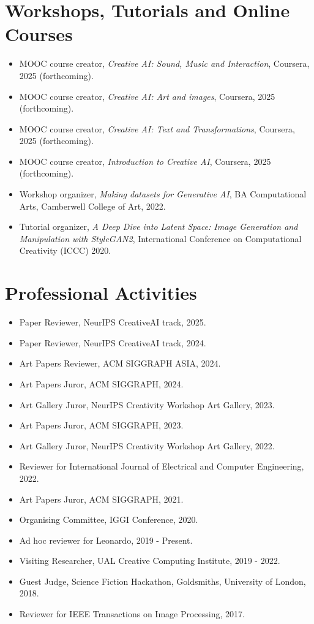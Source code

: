 \documentclass[letterpaper,11pt]{article}
\newcommand{\resumeItem}[2]{
  \item\small{
    \textbf{#1}{ #2 \vspace{-2pt}}
  }
}
\newcommand{\resumeSubItem}[2]{\resumeItem{#1}{#2}\vspace{-4pt}}
\newcommand{\resumeSubHeadingListStart}{\begin{itemize}[leftmargin=*]}
\newcommand{\resumeSubHeadingListEnd}{\end{itemize}}
\begin{document}
\section{Workshops, Tutorials and Online Courses}
\resumeSubHeadingListStart
\resumeSubItem{}{MOOC course creator, \textit{Creative AI: Sound, Music and Interaction}, Coursera, 2025 (forthcoming).}
\resumeSubItem{}{MOOC course creator, \textit{Creative AI: Art and images}, Coursera, 2025 (forthcoming).}
\resumeSubItem{}{MOOC course creator, \textit{Creative AI: Text and Transformations}, Coursera, 2025 (forthcoming).}
 \resumeSubItem{}{MOOC course creator, \textit{Introduction to Creative AI}, Coursera, 2025 (forthcoming).}
 \resumeSubItem{}{Workshop organizer, \textit{Making datasets for Generative AI}, BA Computational Arts, Camberwell College of Art,
 2022.}
 \resumeSubItem{}{Tutorial organizer, \textit{A Deep Dive into Latent Space: Image Generation and Manipulation with StyleGAN2}, International Conference on Computational Creativity (ICCC) 2020.}
\resumeSubHeadingListEnd

\section{Professional Activities}
 \resumeSubHeadingListStart
 \resumeSubItem{}{Paper Reviewer, NeurIPS CreativeAI track, 2025.}
  \resumeSubItem{}{Paper Reviewer, NeurIPS CreativeAI track, 2024.}
  \resumeSubItem{}{Art Papers Reviewer, ACM SIGGRAPH ASIA, 2024.}
  \resumeSubItem{}{Art Papers Juror, ACM SIGGRAPH, 2024.}
  \resumeSubItem{}{Art Gallery Juror, NeurIPS Creativity Workshop Art Gallery, 2023.}
  \resumeSubItem{}{Art Papers Juror, ACM SIGGRAPH, 2023.}
  \resumeSubItem{}{Art Gallery Juror, NeurIPS Creativity Workshop Art Gallery, 2022.}
  \resumeSubItem{}{Reviewer for International Journal of Electrical and Computer Engineering, 2022.}
  \resumeSubItem{}{Art Papers Juror, ACM SIGGRAPH, 2021.}
  \resumeSubItem{}{Organising Committee, IGGI Conference, 2020.}
\resumeSubItem{}{Ad hoc reviewer for Leonardo, 2019 - Present.}
 \resumeSubItem{}{Visiting Researcher, UAL Creative Computing Institute, 2019 - 2022.}
  \resumeSubItem{}{Guest Judge, Science Fiction Hackathon, Goldsmiths, University of London, 2018.}
  \resumeSubItem{}{Reviewer for IEEE Transactions on Image Processing, 2017.}
 \resumeSubHeadingListEnd

  
\end{document}
